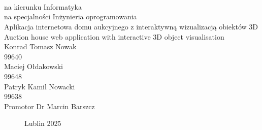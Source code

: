 \documentclass[12pt,a4paper]{article}
\def\blankpage{%
      \clearpage%
      \thispagestyle{empty}%
      \null%
      \clearpage}
\newcommand{\newCharapter}[1]{\newpage }
\begin{document}

\begin{titlepage}
    \titlepagefont
     \\
    \vspace{4cm}
    \break
    \fontsize{1.4cm}{1.4cm} \\
    \fontsize{1.4cm}{1.4cm} \\
    \vspace{0.5cm}
    \break
    \normalsize{} na kierunku Informatyka \\
    na specjalności Inżynieria oprogramowania \\
    \vspace{1cm}
    \break
    \large
    Aplikacja internetowa domu aukcyjnego z interaktywną wizualizacją obiektów 3D \\
    \break
    Auction house web application with interactive 3D object visualisation \\
    \vspace{1.5cm}
    \break
    Konrad Tomasz Nowak \\
    99640   \\[0.3cm]
    Maciej Ołdakowski \\
    99648   \\[0.3cm]
    Patryk Kamil Nowacki \\
    99638   \\[0.3cm]
    \vspace{1.5cm}
    \break
    \normalsize{}
    Promotor Dr Marcin Barszcz
    \vspace*{\fill}
    \begin{figure}[bbp]
        {\titlepagefont Lublin 2025}
    \end{figure}
\end{titlepage}

\onehalfspacing
\blankpage

\newCharapter{chapters/0abstract}
\setcounter{figure}{0}
\tableofcontents
\newCharapter{chapters/1wstep}
\setcounter{figure}{0}
\newCharapter{chapters/2cel_zakres_pracy}
\setcounter{figure}{0}
\newCharapter{chapters/3analiza_rynku}
\setcounter{figure}{0}
\newCharapter{chapters/4technologie}
\setcounter{figure}{0}
\newCharapter{chapters/5projekt}

\nocite{*}
\end{document}
